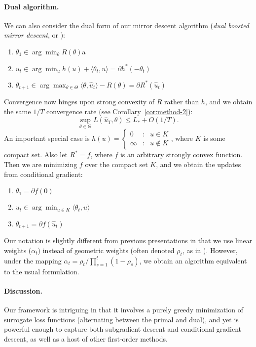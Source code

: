 \documentclass{article} %
\begin{document}
\paragraph{Dual algorithm.}
We can also consider the dual form of our mirror descent algorithm 
({\em dual boosted mirror descent}, or \dual):
\begin{enumerate}
\item $\theta_1 \in \arg\min_{\theta} R(\theta)$a
\item $u_t \in \arg\min_{u} h(u) + \langle \theta_t, u \rangle = \partial h^{*}(-\theta_{t})$
\item $\theta_{t+1} \in \arg\max_{\theta \in \Theta} \langle \theta, \hat{u}_t \rangle - R(\theta) = \partial R^{*}(\hat u_{t})$
\end{enumerate}
Convergence now hinges upon strong convexity of $R$ rather than 
$h$, and we obtain the same $1/T$ convergence 
rate (see Corollary~\ref{cor:method-2}):
\[ \sup_{\theta \in \Theta} L(\hat{u}_T, \theta) \leq L_{*} + O(1/T). \]
An important special case is $h(u) = \left\{ \begin{array}{ccl} 0 & : & u \in K \\ \infty & : & u \not\in K \end{array} \right.$, where $K$ is some 
compact set. Also let $R^* = f$, where $f$ is an arbitrary strongly convex 
function. Then we are minimizing $f$ over the compact set $K$, and we obtain 
the updates from conditional gradient:
\begin{enumerate}
\item $\theta_1 = \partial f(0)$
\item $u_t \in \arg\min_{u \in K} \langle \theta_t, u \rangle$
\item $\theta_{t+1} = \partial f(\hat{u}_t)$
\end{enumerate}
Our notation is slightly different from previous presentations in 
that we use linear weights ($\alpha_t$) instead of geometric weights 
(often denoted $\rho_t$, as in \cite{Bach:2012b}). However, under the 
mapping $\alpha_t = \rho_t/\prod_{s=1}^t (1-\rho_s)$, we obtain an 
algorithm equivalent to the usual formulation.

\paragraph{Discussion.}
Our framework is intriguing in that it involves a purely greedy minimization 
of surrogate loss functions (alternating between the primal and dual), and yet 
is powerful enough to capture both subgradient descent and conditional gradient 
descent, as well as a host of other first-order methods. 
\end{document}
